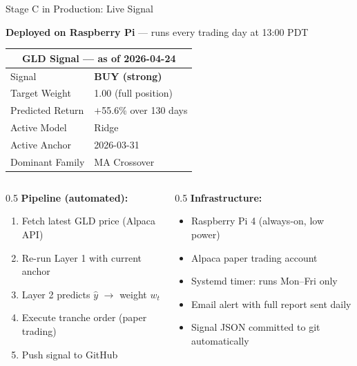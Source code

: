 \documentclass[aspectratio=169]{beamer}
\begin{document}
\begin{frame}{Stage C in Production: Live Signal}

  \textbf{Deployed on Raspberry Pi} --- runs every trading day at 13:00 PDT

  \vspace{0.4em}
  \begin{center}
  \begin{tabular}{ll}
    \toprule
    \multicolumn{2}{c}{\textbf{GLD Signal --- as of 2026-04-24}} \\
    \midrule
    Signal              & \textbf{BUY (strong)} \\
    Target Weight       & 1.00 \quad (full position) \\
    Predicted Return    & $+$55.6\% over 130 days \\
    Active Model        & Ridge \\
    Active Anchor       & 2026-03-31 \\
    Dominant Family     & MA Crossover \\
    \bottomrule
  \end{tabular}
  \end{center}

  \vspace{0.5em}
  \begin{columns}[T]
    \begin{column}{0.5\textwidth}
      \textbf{Pipeline (automated):}
      \begin{enumerate}\small
        \item Fetch latest GLD price (Alpaca API)
        \item Re-run Layer 1 with current anchor
        \item Layer 2 predicts $\hat{y}$ $\to$ weight $w_t$
        \item Execute tranche order (paper trading)
        \item Push signal to GitHub
      \end{enumerate}
    \end{column}
    \begin{column}{0.5\textwidth}
      \textbf{Infrastructure:}
      \begin{itemize}\small
        \item Raspberry Pi 4 (always-on, low power)
        \item Alpaca paper trading account
        \item Systemd timer: runs Mon--Fri only
        \item Email alert with full report sent daily
        \item Signal JSON committed to git automatically
      \end{itemize}
    \end{column}
  \end{columns}

\end{frame}
\end{document}

